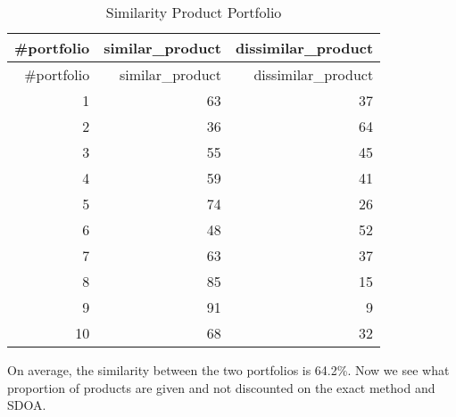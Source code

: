 \documentclass[
]{article}
\begin{document}
\begin{longtable}[]{@{}rrr@{}}
\caption{Similarity Product Portfolio}\tabularnewline
\toprule()
\#portfolio & similar\_product & dissimilar\_product \\
\midrule()
\endfirsthead
\toprule()
\#portfolio & similar\_product & dissimilar\_product \\
\midrule()
\endhead
1 & 63 & 37 \\
2 & 36 & 64 \\
3 & 55 & 45 \\
4 & 59 & 41 \\
5 & 74 & 26 \\
6 & 48 & 52 \\
7 & 63 & 37 \\
8 & 85 & 15 \\
9 & 91 & 9 \\
10 & 68 & 32 \\
\bottomrule()
\end{longtable}

On average, the similarity between the two portfolios is 64.2\%. Now we
see what proportion of products are given and not discounted on the
exact method and SDOA.
\end{document}
